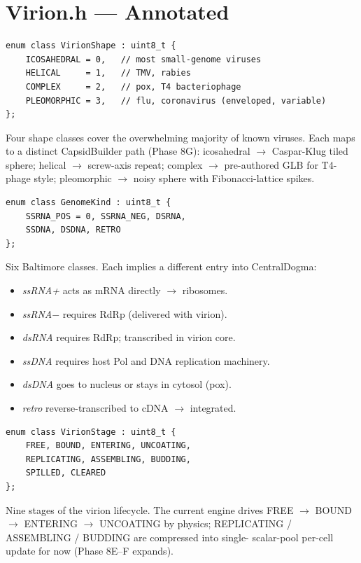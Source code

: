 \documentclass[11pt,letterpaper,twoside,openany]{book}
\begin{document}
\chapter{Virion.h --- Annotated}
\label{ch:virion-line}

\begin{lstlisting}
enum class VirionShape : uint8_t {
    ICOSAHEDRAL = 0,   // most small-genome viruses
    HELICAL     = 1,   // TMV, rabies
    COMPLEX     = 2,   // pox, T4 bacteriophage
    PLEOMORPHIC = 3,   // flu, coronavirus (enveloped, variable)
};
\end{lstlisting}
Four shape classes cover the overwhelming majority of known
viruses. Each maps to a distinct CapsidBuilder path (Phase 8G):
icosahedral $\to$ Caspar-Klug tiled sphere; helical $\to$
screw-axis repeat; complex $\to$ pre-authored GLB for T4-phage
style; pleomorphic $\to$ noisy sphere with Fibonacci-lattice
spikes.

\begin{lstlisting}
enum class GenomeKind : uint8_t {
    SSRNA_POS = 0, SSRNA_NEG, DSRNA,
    SSDNA, DSDNA, RETRO
};
\end{lstlisting}
Six Baltimore classes. Each implies a different entry into
CentralDogma:
\begin{itemize}
  \item \emph{ssRNA+} acts as mRNA directly $\to$ ribosomes.
  \item \emph{ssRNA$-$} requires RdRp (delivered with virion).
  \item \emph{dsRNA} requires RdRp; transcribed in virion core.
  \item \emph{ssDNA} requires host Pol and DNA replication machinery.
  \item \emph{dsDNA} goes to nucleus or stays in cytosol (pox).
  \item \emph{retro} reverse-transcribed to cDNA $\to$ integrated.
\end{itemize}

\begin{lstlisting}
enum class VirionStage : uint8_t {
    FREE, BOUND, ENTERING, UNCOATING,
    REPLICATING, ASSEMBLING, BUDDING,
    SPILLED, CLEARED
};
\end{lstlisting}
Nine stages of the virion lifecycle. The current engine drives
FREE $\to$ BOUND $\to$ ENTERING $\to$ UNCOATING by physics;
REPLICATING / ASSEMBLING / BUDDING are compressed into single-
scalar-pool per-cell update for now (Phase 8E--F expands).
\end{document}
